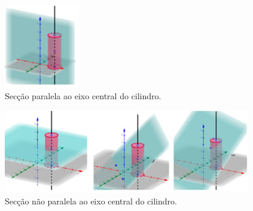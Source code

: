 \begin{figure}[htpb]
\centering
\begin{minipage}{.25\textwidth}
\includegraphics[width=\textwidth]{figures/figure05.jpg}
\caption{Secção paralela ao eixo central do cilindro.}
\label{fig-05}
\end{minipage}
\end{figure}

\begin{figure}[htpb]
\centering
\begin{minipage}{.5\textwidth}
\includegraphics[width=\textwidth]{figures/figure06.jpg}
\caption{Secção não paralela ao eixo central do cilindro.}
\label{fig-06}
\end{minipage}
\end{figure}

